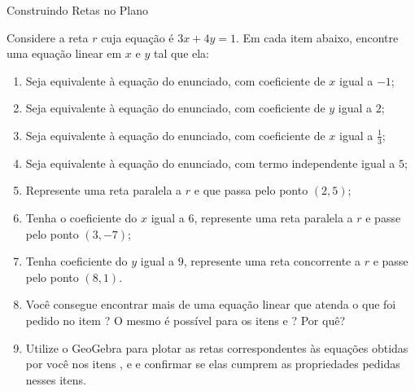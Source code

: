 \label{\detokenize{AF107-4:praticando-posiçoes-relativas}}\label{\detokenize{AF107-4::doc}}

\begin{task}{Construindo Retas no Plano}

Considere a reta $r$ cuja equação é $3x + 4y = 1$. Em cada item abaixo, encontre uma equação linear em $x$ e $y$ tal que ela:


\begin{enumerate}
\item{}
Seja equivalente à equação do enunciado, com coeficiente de $x$ igual a $-1$;

\item{}
Seja equivalente à equação do enunciado, com coeficiente de $y$ igual a $2$;

\item{}
Seja equivalente à equação do enunciado, com coeficiente de $x$ igual a $\frac{1}{3}$;

\item{}
Seja equivalente à equação do enunciado, com termo independente igual a $5$;

\item{}
Represente uma reta paralela a $r$ e que passa pelo ponto $(2,5)$;

\item{}
Tenha o coeficiente do $x$ igual a $6$, represente uma reta paralela a $r$ e passe pelo ponto $(3,-7)$;

\item{}
Tenha coeficiente do $y$ igual a $9$, represente uma reta concorrente a $r$ e passe pelo ponto $(8,1)$.

\item{}	
Você consegue encontrar mais de uma equação linear que atenda o que foi pedido no item ? O mesmo é possível para os itens  e ? Por quê?

\item{}
Utilize o GeoGebra para plotar as retas correspondentes às equações obtidas por você nos itens ,  e  e confirmar se elas cumprem as propriedades pedidas nesses itens.
\end{enumerate}

\end{task}

